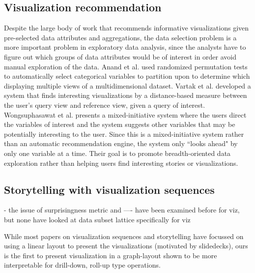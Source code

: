 \subsection{Visualization recommendation}
\par Despite the large body of work that recommends informative visualizations given pre-selected data attributes and aggregations, the data selection problem is a more important problem in exploratory data analysis, since the analysts have to figure out which groups of data attributes would be of interest in order avoid manual exploration of the data. Anand et al. \cite{Anand2015} used randomized permutation tests to automatically select categorical variables to partition upon to determine which displaying multiple views of a multidimensional dataset. Vartak et al. \cite{Vartak2015} developed a system that finds interesting visualizations by a distance-based measure between the user's query view and reference view,  given a query of interest. Wongsuphasawat et al. \cite{Wongsuphasawat2016} presents a mixed-initiative system where the users direct the variables of interest and the system suggests other variables that may be potentially interesting to the user. Since this is a mixed-initiative system rather than an automatic recommendation engine, the system only ``looks ahead"  by only one variable at a time. Their goal is to promote breadth-oriented data exploration rather than helping users find interesting stories or visualizations.
\subsection{Storytelling with visualization sequences}
- the issue of surprisingness metric and ---- have been examined before for viz, but none have looked at data subset lattice specifically for viz

While most papers on visualization sequences and storytelling have focussed on using a linear layout to present the visualizations (motivated by slidedecks), ours is the first to present visualization in a graph-layout shown to be more interpretable for drill-down, roll-up type operations.